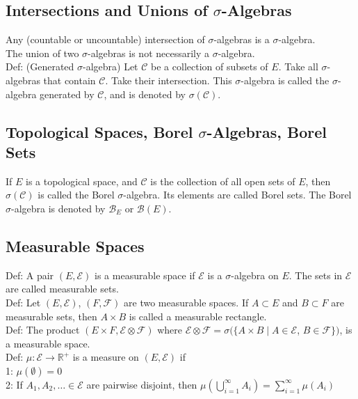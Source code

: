 \documentclass[english, 11pt]{article}
\begin{document}
\subsection{Intersections and Unions of $\sigma$-Algebras}

Any (countable or uncountable) intersection of $\sigma$-algebras is a $\sigma$-algebra.\\

The union of two $\sigma$-algebras is not necessarily a $\sigma$-algebra.\\

Def: (Generated $\sigma$-algebra) Let $\mathcal{C}$ be a collection of subsets of $E$. Take all $\sigma$-algebras that contain $\mathcal{C}$. Take their intersection. This $\sigma$-algebra is called the $\sigma$-algebra generated by $\mathcal{C}$, and is denoted by $\sigma(\mathcal{C})$.

\subsection{Topological Spaces, Borel $\sigma$-Algebras, Borel Sets}

If $E$ is a topological space, and $\mathcal{C}$ is the collection of all open sets of $E$, then $\sigma (\mathcal{C})$ is called the Borel $\sigma$-algebra. Its elements are called Borel sets. The Borel $\sigma$-algebra is denoted by $\mathcal{B}_E$ or $\mathcal{B}(E)$.

\subsection{Measurable Spaces}
Def: A pair $(E, \mathcal{E})$ is a measurable space if $\mathcal{E}$ is a $\sigma$-algebra on $E$. The sets in $\mathcal{E}$ are called measurable sets.\\

Def: Let $(E, \mathcal{E})$, $(F, \mathcal{F})$ are two measurable spaces. If $A \subset E$ and $B \subset F$ are measurable sets, then $A \times B$ is called a measurable rectangle.\\

Def: The product $(E \times F, \mathcal{E} \otimes \mathcal{F})$ where $\mathcal{E} \otimes \mathcal{F} = \sigma(\{A \times B \mid A \in \mathcal{E}$, $B \in \mathcal{F}\})$, is a measurable space.\\

Def: $\mu: \mathcal{E} \to \mathbb{R^+}$ is a measure on $(E, \mathcal{E})$ if\\
1: $\mu(\emptyset) = 0$\\
2: If $A_1, A_2, \dots \in \mathcal{E}$ are pairwise disjoint, then $\mu(\bigcup^\infty_{i = 1} A_i) = \sum^\infty_{i = 1}\mu(A_i)$\\
\end{document}
